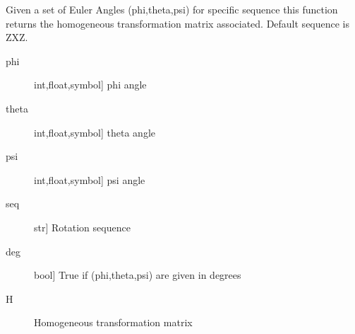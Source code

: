 \documentclass[letterpaper,10pt,english]{sphinxmanual}
\begin{document}
\begin{fulllineitems}
\end{fulllineitems}


\begin{fulllineitems}
\label{\detokenize{_src/didactic:rkd.didactic.transformations.eul2htm}}
Given a set of Euler Angles (phi,theta,psi) for specific 
sequence this function returns the homogeneous transformation 
matrix associated. Default sequence is ZXZ.
\begin{description}
\item[{phi}] \leavevmode{[}int,float,symbol{]}
phi angle

\item[{theta}] \leavevmode{[}int,float,symbol{]}
theta angle

\item[{psi}] \leavevmode{[}int,float,symbol{]}
psi angle

\item[{seq}] \leavevmode{[}str{]}
Rotation sequence

\item[{deg}] \leavevmode{[}bool{]}
True if (phi,theta,psi) are given in degrees

\end{description}
\begin{description}
\item[{H}] \leavevmode{[}\sphinxcode{\sphinxupquote{sympy.matrices.dense.MutableDenseMatrix}}{]}
Homogeneous transformation matrix

\end{description}

%
\begin{sphinxVerbatim}[commandchars=\\\{\}]
\end{sphinxVerbatim}

%
\begin{sphinxVerbatim}[commandchars=\\\{\}]
\end{sphinxVerbatim}


\end{fulllineitems}
\end{document}
